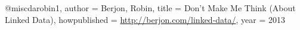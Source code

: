 @misc{darobin1,
author = {Berjon, Robin},
title = {{Don't Make Me Think (About Linked Data)}},
howpublished = {\url{http://berjon.com/linked-data/}},
year = {2013}
}
